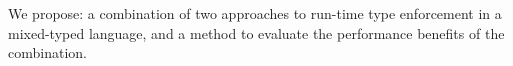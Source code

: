 We propose: a combination of two approaches to run-time type enforcement in a
mixed-typed language, and a method to evaluate the performance benefits of the
combination.
